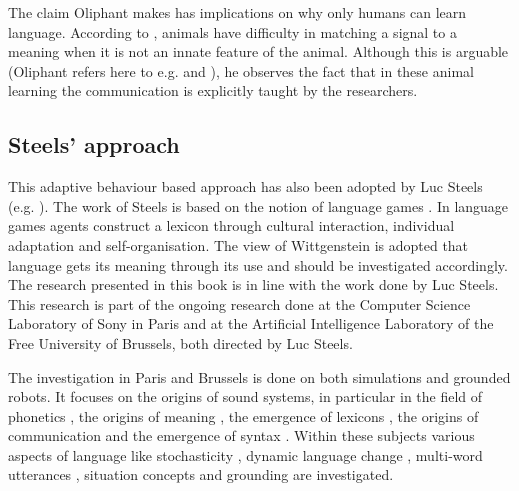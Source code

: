 The claim Oliphant makes has implications on why only humans can learn language. According to \citet{oliphant:1998}, animals have difficulty in matching a signal to a meaning when it is not an innate feature of the animal. Although this is arguable (Oliphant refers here to e.g. \citealt{gardners:1969} and \citealt{premack:1971}), he observes the fact that in these animal learning the communication is explicitly taught by the researchers.


\subsection{Steels' approach}\label{s:intro:th}



This adaptive behaviour based approach has also been adopted by Luc Steels (e.g. \citealt{steels:1996a,steels:1996b,steels:1997b}). The work of Steels is based on the notion of {\sc language games} \citep{wittgenstein:1958}. In language games agents construct a lexicon through cultural interaction, individual adaptation and self-organisation. The view of Wittgenstein is adopted that language gets its meaning through its use and should be investigated accordingly. The research presented in this book is in line with the work done by Luc Steels. This research is part of the ongoing research done at the Computer Science Laboratory of Sony in Paris and at the Artificial Intelligence Laboratory of the Free University of Brussels, both directed by Luc Steels. 

The investigation in Paris and Brussels is done on both simulations and grounded robots. It focuses on the origins of sound systems, in particular in the field of phonetics \citep{deboer:1997,deboer:1999,oudeyer:1999}, the origins of meaning \citep{steels:1996b,steelsvogt:1997,dejongvogt:1998,vogt:1998a,dejong:1999}, the emergence of lexicons \citep{steels:1996a,steelskaplan:1998,kaplan:2000,vogt:1998b,vanlooveren:1999}, the origins of communication \citep{dejong:1999c,dejong:2000} and the emergence of syntax \citep{steels:2000a}. Within these subjects various aspects of language like stochasticity \citep{steelskaplan:1998,kaplan:2000}, dynamic language change \citep{steels:1997c,steelsmcintyre:1999,deboervogt:1999}, multi-word utterances \citep{vanlooveren:1999}, situation concepts \citep{dejong:99b} and grounding \citep{belpaeme:1998,steelsvogt:1997,steels:2000,kaplan:2000} are investigated.


